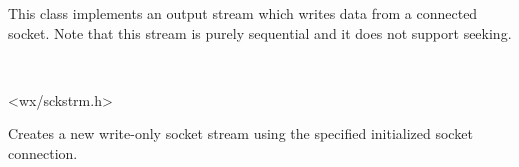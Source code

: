 This class implements an output stream which writes data from
a connected socket. Note that this stream is purely sequential
and it does not support seeking.


\\


<wx/sckstrm.h>






\label{wxsocketoutputstreamctor}


Creates a new write-only socket stream using the specified initialized
socket connection.


